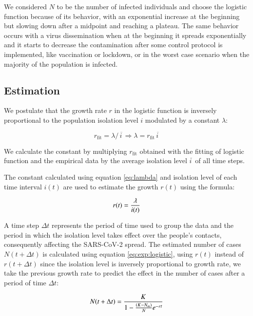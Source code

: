 \documentclass[review]{elsarticle}
\begin{document}
We considered $N$ to be the number of infected individuals 
and choose the logistic function because of its behavior, 
with an exponential increase at the beginning but slowing down after 
a  midpoint and reaching a plateau. 
The same behavior occurs with a virus dissemination when at the 
beginning it spreads exponentially and it starts to 
decrease the contamination after some control protocol is implemented, 
like vaccination or lockdown, 
or in the worst case scenario when the majority of the population is infected.

\subsection{Estimation}

We postulate that the growth rate $r$ in the logistic function is 
inversely proportional to the population isolation level $i$ 
modulated by a constant $\lambda$:

\begin{equation}
r_{\text{fit}} = {\lambda /\, \overline{i\,}} \Rightarrow \lambda = r_{\text{fit}}\, \overline{i\,}
\label{eq:lambda}
\end{equation}

We calculate the constant by multiplying $r_{\text{fit}}$ 
obtained with the fitting of 
logistic function and the empirical data by 
the average isolation level $\overline{i\,}$  
of all time steps.

The constant calculated using equation \ref{eq:lambda} 
and isolation level of each time interval $i(t)$ 
are used to estimate the growth $r(t)$ using the formula:

\begin{equation}
r(t) = {\lambda\over i(t)}
\label{eq:rt}
\end{equation}

A time step $\Delta t$ represents the period of time used to group the data 
and the period in which the isolation level takes effect over
 the people's contacts, consequently affecting the SARS-CoV-2 spread. 
The estimated number of cases $N(t+\Delta t)$ is calculated using
 equation \ref{eq:exp:logistic}, using $r(t)$ instead of $r(t+\Delta t)$ since 
the isolation level is inversely proportional to growth rate, we take
 the previous growth rate to predict the effect in the number of cases after a 
period of time $\Delta t$:

\begin{equation}
N(t+\Delta t) = {K \over {1- {(K-N_{m}) \over N} e^{-rt}}}
\label{eq:exp:delta:logistic}
\end{equation}
\end{document}
